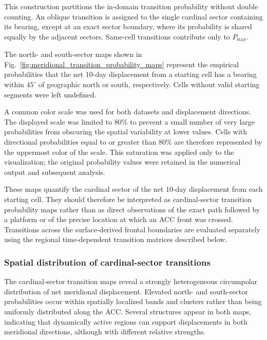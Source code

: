 \documentclass[
  draft
]{agujournal2025}
\begin{document}
            This construction partitions the in-domain transition probability without double counting. An oblique transition is assigned to the single cardinal sector containing its bearing, except at an exact sector boundary, where its probability is shared equally by the adjacent sectors. Same-cell transitions contribute only to $P_{\mathrm{stay}}$.

            The north- and south-sector maps shown in Fig.~\ref{fig:meridional_transition_probability_maps} represent the empirical probabilities that the net $10$-day displacement from a starting cell has a bearing within $45^{\circ}$ of geographic north or south, respectively. Cells without valid starting segments were left undefined.

            A common color scale was used for both datasets and displacement directions. The displayed scale was limited to $80\%$ to prevent a small number of very large probabilities from obscuring the spatial variability at lower values. Cells with directional probabilities equal to or greater than $80\%$ are therefore represented by the uppermost color of the scale. This saturation was applied only to the visualization; the original probability values were retained in the numerical output and subsequent analysis.

            These maps quantify the cardinal sector of the net $10$-day displacement from each starting cell. They should therefore be interpreted as cardinal-sector transition probability maps rather than as direct observations of the exact path followed by a platform or of the precise location at which an ACC front was crossed. Transitions across the surface-derived frontal boundaries are evaluated separately using the regional time-dependent transition matrices described below. 
            
            \subsubsection{Spatial distribution of cardinal-sector transitions}
                The cardinal-sector transition maps reveal a strongly heterogeneous circumpolar distribution of net meridional displacement. Elevated north- and south-sector probabilities occur within spatially localized bands and clusters rather than being uniformly distributed along the ACC. Several structures appear in both maps, indicating that dynamically active regions can support displacements in both meridional directions, although with different relative strengths.
\end{document}
